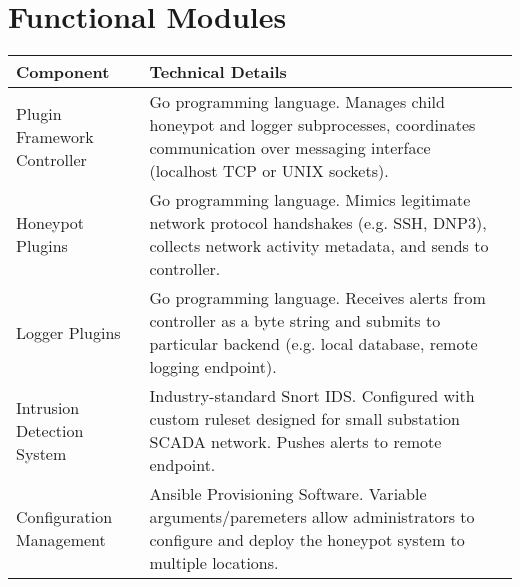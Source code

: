 \section*{\color{NavyBlue}Functional Modules}

\large

\begin{center}
\begin{tabularx}{\linewidth}{X | X}
\toprule
\textbf{Component} & \textbf{Technical Details} \\
\midrule
Plugin Framework Controller & Go programming language. Manages child honeypot and logger subprocesses, coordinates communication over messaging interface (localhost TCP or UNIX sockets).\\ \hline
Honeypot Plugins & Go programming language. Mimics legitimate network protocol handshakes (e.g. SSH, DNP3), collects network activity metadata, and sends to controller. \\ \hline
Logger Plugins & Go programming language. Receives alerts from controller as a byte string and submits to particular backend (e.g. local database, remote logging endpoint).\\ \hline
Intrusion Detection System & Industry-standard Snort IDS. Configured with custom ruleset designed for small substation SCADA network. Pushes alerts to remote
endpoint. \\ \hline
Configuration Management & Ansible Provisioning Software. Variable arguments/paremeters allow administrators to configure and deploy the honeypot system to multiple locations.  \\
\bottomrule
\end{tabularx}
\end{center}
